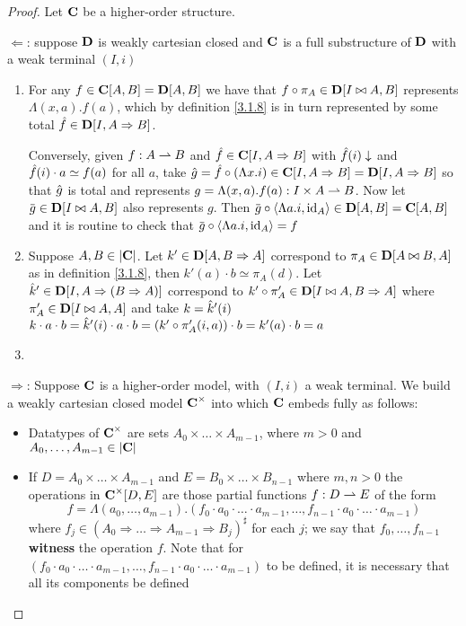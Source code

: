 \documentclass[11pt]{article}
\begin{document}
\begin{proof}
Let \(\operatorname{\textbf{C}}\) be a higher-order structure.

\(\Leftarrow\): suppose \(\operatorname{\textbf{D}}\) is weakly cartesian closed and \(\operatorname{\textbf{C}}\) is a
full substructure of \(\operatorname{\textbf{D}}\) with a weak terminal \((I,i)\)
\begin{enumerate}
\item For any \(f\in\operatorname{\textbf{C}}[A,B]=\operatorname{\textbf{D}}[A,B]\) we have that \(f\circ\pi_A\in\operatorname{\textbf{D}}[I\bowtie A,B]\) represents \(\Lambda(x,a).f(a)\),
which by definition \ref{3.1.8} is in turn represented by some total \(\hat{f}\in\operatorname{\textbf{D}}[I,A\Rightarrow B]\).

Conversely, given \(f:A\rightharpoonup B\) and \(\hat{f}\in\operatorname{\textbf{C}}[I,A\Rightarrow B]\) with \(\hat{f}(i)\downarrow\)
and \(\hat{f}(i)\cdot a\simeq f(a)\) for all \(a\), take \(\hat{g}=\hat{f}\circ(\Lambda x.i)\in\operatorname{\textbf{C}}[I,A\Rightarrow B]=\operatorname{\textbf{D}}[I,A\Rightarrow B]\) so
that \(\hat{g}\) is total and represents \(g=\Lambda(x,a).f(a):I\times A\rightharpoonup B\). Now
let \(\barg\in\bD[I\bowtie A,B]\) also represents \(g\). Then \(\barg\circ\la\Lambda a.i,\id_A\ra\in\bD[A,B]=\bC[A,B]\) and
it is routine to check that \(\barg\circ\la\Lambda a.i,\id_A\ra=f\)

\item Suppose \(A,B\in\abs{\bC}\). Let \(k'\in\operatorname{\textbf{D}}[A,B\Rightarrow A]\) correspond to \(\pi_A\in\operatorname{\textbf{D}}[A\bowtie B,A]\) as in
definition \ref{3.1.8}, then \(k'(a)\cdot b\simeq\pi_A(d)\). Let \(\hat{k}'\in\operatorname{\textbf{D}}[I,A\Rightarrow(B\Rightarrow A)]\) correspond
to \(k'\circ\pi_A'\in\operatorname{\textbf{D}}[I\bowtie A,B\Rightarrow A]\) where \(\pi_A'\in\operatorname{\textbf{D}}[I\bowtie A,A]\) and take \(k=\hat{k}'(i)\)
\(k\cdot a\cdot b=\hat{k}'(i)\cdot a\cdot b=(k'\circ\pi_A'(i,a))\cdot b=k'(a)\cdot b=a\)

\item 
\end{enumerate}

\(\Rightarrow\): Suppose \(\operatorname{\textbf{C}}\) is a higher-order model, with \((I,i)\) a weak terminal. We build a weakly
cartesian closed model \(\operatorname{\textbf{C}}^\times\) into which \(\operatorname{\textbf{C}}\) embeds fully as follows:
\begin{itemize}
\item Datatypes of \(\operatorname{\textbf{C}}^\times\) are sets \(A_0\times\dots\times A_{m-1}\), where \(m>0\) and \(A_0,\dots,A_{m-1}\in\abs{\bC}\)
\item If \(D=A_0\times\dots\times A_{m-1}\) and \(E=B_0\times\dots\times B_{n-1}\) where \(m,n>0\) the operations
in \(\operatorname{\textbf{C}}^\times[D,E]\) are those partial functions \(f:D\rightharpoonup E\) of the form
\begin{equation*}
f=\Lambda(a_0,\dots,a_{m-1}).(f_0\cdot a_0\cdot\dots\cdot a_{m-1},\dots,f_{n-1}\cdot a_0\cdot\dots\cdot a_{m-1})
\end{equation*}
where \(f_j\in(A_0\Rightarrow\dots\Rightarrow A_{m-1}\Rightarrow B_j)^\sharp\) for each \(j\); we say that \(f_0,\dots,f_{n-1}\) \textbf{witness}
the operation \(f\). Note that for \((f_0\cdot a_0\cdot\dots\cdot a_{m-1},\dots,f_{n-1}\cdot a_0\cdot\dots\cdot a_{m-1})\) to be
defined, it is necessary that all its components be defined
\end{itemize}



\end{proof}
\end{document}
